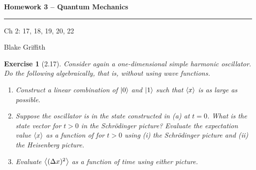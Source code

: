 
\usepackage{amsfonts, amsmath, amsthm}

\setlength{\parskip}{1ex}
\setlength{\parindent}{0pt}

\newtheorem*{exer}{Exercise}

\newcommand{\lam}{\lambda}



\textbf{Homework 3 -- Quantum Mechanics} \\

\hrule

\begin{minipage}{.80\linewidth}
    \flushleft
    Ch 2: 17, 18, 19, 20, 22 \\
\end{minipage}
\begin{minipage}{.20\linewidth}
    \flushright
    Blake Griffith
\end{minipage}


\begin{exer}[2.17]

    Consider again a one-dimensional simple harmonic oscillator. Do the
    following algebraically, that is, without using wave functions.

    \begin{enumerate}
        \item Construct a linear combination of $\left| 0 \right>$ and $\left| 1 \right>$
            such that $\left< x \right>$ is as large as possible.

        \item Suppose the oscillator is in the state constructed in (a)
            at $t=0$. What is the state vector for $t>0$ in the
            Schr\"{o}dinger picture? Evaluate the expectation value
            $\left< x \right>$ as a function of for $t>0$ using (i) the
            Schr\"{o}dinger picture and (ii) the Heisenberg picture.

        \item Evaluate $\left< (\Delta x)^2 \right>$ as a function of time using
            either picture.

    \end{enumerate}

\end{exer}

